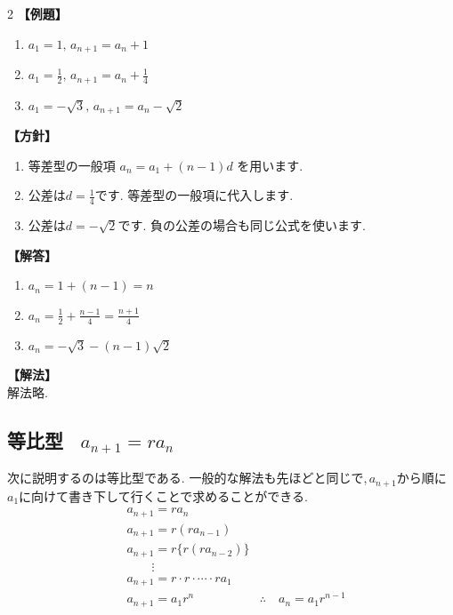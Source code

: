\documentclass[dvipdfmx,a4paper,11pt,fleqn,openany]{jsbook}
\begin{document}
\begin{multicols*}{2}
      \noindent \textbf{【例題】}
      \begin{enumerate}[label=(\arabic*),parsep=3pt]
        \item $\displaystyle a_1=1,\, a_{n+1}=a_n+1$
        \item $\displaystyle a_1=\frac{1}{2},\, a_{n+1}=a_n+\frac{1}{4}$
        \item $\displaystyle a_1=-\sqrt{3},\, a_{n+1}=a_n-\sqrt{2}$
      \end{enumerate}

      \noindent\textbf{【方針】}
      \begin{enumerate}[label=(\arabic*),parsep=3pt]
        \item 等差型の一般項
              $\displaystyle a_n=a_1+(n-1)d$
              を用います.
        \item 公差は$\displaystyle d=\frac14$です.
              等差型の一般項に代入します.
        \item 公差は$\displaystyle d=-\sqrt2$です.
              負の公差の場合も同じ公式を使います.
      \end{enumerate}

      \noindent\textbf{【解答】}
      \begin{enumerate}[label=(\arabic*),parsep=3pt]
        \item $\displaystyle a_n=1+(n-1)=n$
        \item $\displaystyle a_n=\frac12+\frac{n-1}{4}
              =\frac{n+1}{4}$
        \item $\displaystyle a_n=-\sqrt3-(n-1)\sqrt2$
      \end{enumerate}

      \noindent\textbf{【解法】}\\
      解法略.
    \subsection{等比型 \, $a_{n+1}=ra_n$}
      次に説明するのは等比型である.
      一般的な解法も先ほどと同じで,\,$a_{n+1}$から順に$a_1$に向けて書き下して行くことで求めることができる.
      \begin{align*}
        &a_{n+1}=ra_n\\
        &a_{n+1}=r(ra_{n-1})\\
        &a_{n+1}=r\{r(ra_{n-2})\}\\
        &\qquad \vdots\\
        &a_{n+1}=r\cdot r \cdot \cdots \cdot ra_1\\
        &a_{n+1}=a_1r^n
        &\therefore \quad a_n=a_1r^{n-1}
      \end{align*}


\end{multicols*}
\end{document}
